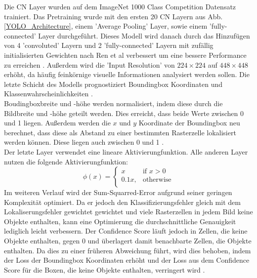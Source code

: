 {{	Die CN Layer wurden auf dem \glqq ImageNet 1000 Class Competition \grqq{} Datensatz trainiert. Das Pretraining wurde mit den ersten 20 CN Layern aus Abb. \ref{YOLO_Architecture}, einem 'Average Pooling' Layer, sowie einem 'fully-connected' Layer durchgeführt. Dieses Modell wird danach durch das Hinzufügen von 4 'convoluted' Layern und 2 'fully-connected' Layern mit zufällig initialisierten Gewichten nach Ren et al  verbessert um eine bessere Performance zu erreichen . Außerdem wird die 'Input Resolution' von $224 \times 224$ auf $448  \times  448$ erhöht, da häufig feinkörnige visuelle Informationen analysiert werden sollen. Die letzte Schicht des Modells prognostiziert Boundingbox Koordinaten und Klassenwahrscheinlichkeiten \citep{Plastiras2018}. \\
	Boudingboxbreite und -höhe werden normalisiert, indem diese durch die Bildbreite und -höhe geteilt werden. Dies erreicht, dass beide Werte zwischen 0 und 1 liegen. Außerdem werden die $x$ und $y$ Koordinate der Boundingbox neu berechnet, dass diese als Abstand zu einer bestimmten Rasterzelle lokalisiert werden können. Diese liegen auch zwischen 0 und 1 \citep{Plastiras2018}. \\
	Der letzte Layer verwendet eine lineare Aktivierungfunktion. Alle anderen Layer nutzen die folgende Aktivierungfunktion: 
	\begin{equation}
		\phi(x) = \begin{cases}
			x & \text{if $x > 0$} \\
			0.1x, & \text{otherwise} \\
		\end{cases}
	\end{equation} 
	Im weiteren Verlauf wird der Sum-Squarred-Error aufgrund seiner geringen Komplexität optimiert. Da er jedoch den Klassifizierungsfehler gleich mit dem Lokaliserungsfehler gewichtet gewichtet und viele Rasterzellen in jedem Bild keine Objekte enthalten, kann eine Optimierung die durchschnittliche Genauigkeit lediglich leicht verbessern. Der Confidence Score läuft jedoch in Zellen, die keine Objekte enthalten, gegen 0 und überlagert damit benachbarte Zellen, die Objekte enthalten. Da dies zu einer früheren Abweichung  führt, wird dies behoben, indem der Loss der Boundingbox Koordinaten erhöht und der Loss aus dem Confidence Score für die Boxen, die keine Objekte enthalten, verringert wird \citep{Plastiras2018}. \\
}}
